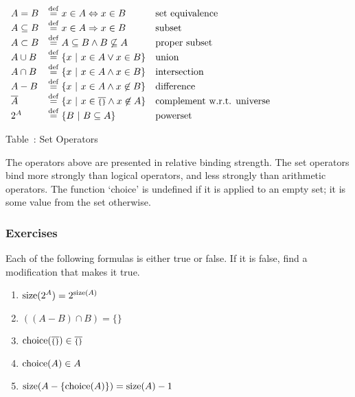 \setcounter{SetOps}{\value{table}}

\begin{center}
$
\begin{array}{lll}
A = B &\stackrel{\rm def}{=} x \in A \Leftrightarrow x \in B
				& \mbox{set equivalence}		\\
A \subseteq B &\stackrel{\rm def}{=} x \in A \Rightarrow x \in B
				& \mbox{subset}				\\
A \subset B &\stackrel{\rm def}{=} A \subseteq B \wedge B \not\subseteq A
				& \mbox{proper subset}			\\
A \cup B &\stackrel{\rm def}{=} \{x\ |\ x \in A \vee x \in B\}	& {\rm union}	\\
A \cap B &\stackrel{\rm def}{=} \{x\ |\ x \in A \wedge x \in B\}	& {\rm intersection}\\
A - B &\stackrel{\rm def}{=} \{x\ |\ x \in A \wedge x \not\in B\}	& {\rm difference}\\
\overline{A} &\stackrel{\rm def}{=} \{x\ |\ x \in \mbox{$\overline{\scriptstyle\{\}}$} \wedge x \not\in A\} 
				& \mbox{complement w.r.t. universe}	\\
2^A &\stackrel{\rm def}{=} \{B\ |\ B \subseteq A\}	& \mbox{powerset}		\\
\end{array}
$
\end{center}

\begin{center}
Table~\thetable: Set Operators
\end{center}

\noindent
The operators above are presented in relative binding strength.  
The set operators bind more strongly than logical operators, 
and less strongly than arithmetic operators.  
The function `choice' is undefined if it is applied to an empty set; 
it is some value from the set otherwise.

\subsubsection{Exercises}
Each of the following formulas is either true or false.  
If it is false, find a modification that makes it true.

\begin{enumerate}\setcounter{enumi}{\value{RunningExercise}}

\item ${\rm size}(2^A) = 2^{{\rm size}(A)}$

\item $((A-B)\cap B) = \{\}$

\item ${\rm choice}(\mbox{$\overline{\scriptstyle\{\}}$}) \in \mbox{$\overline{\scriptstyle\{\}}$}$

\item ${\rm choice}(A) \in A$
	
\item ${\rm size}(A-\{{\rm choice}(A)\}) = {\rm size}(A)-1$

\setcounter{RunningExercise}{\value{enumi}}
\end{enumerate}

